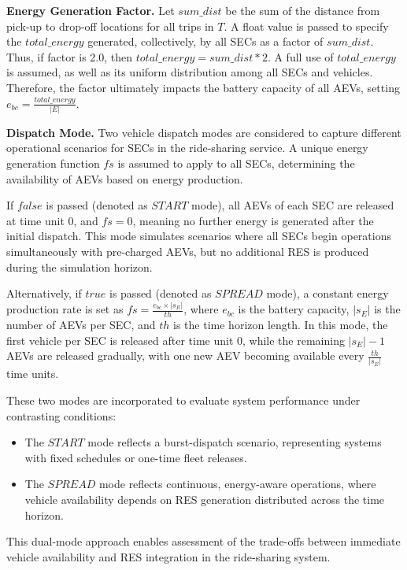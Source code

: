 \textbf{Energy Generation Factor.} Let $sum\_dist$ be the sum of the distance from pick-up to drop-off locations for all trips in $T$.  A float value is passed to specify the $total\_energy$ generated, collectively, by all SECs as a factor of $sum\_dist$. Thus, if factor is 2.0, then $total\_energy = sum\_dist * 2$.  A full use of $total\_energy$ is assumed, as well as its uniform distribution among all SECs and vehicles. Therefore,  the factor ultimately impacts the battery capacity of all AEVs, setting $e_{bc} = \frac{total\_energy}{|E|}$. 

\textbf{Dispatch Mode.} Two vehicle dispatch modes are considered to capture different operational scenarios for SECs in the ride-sharing service. A unique energy generation function $fs$ is assumed to apply to all SECs, determining the availability of AEVs based on energy production.

If $false$ is passed (denoted as $START$ mode), all AEVs of each SEC are released at time unit 0, and $fs = 0$, meaning no further energy is generated after the initial dispatch. This mode simulates scenarios where all SECs begin operations simultaneously with pre-charged AEVs, but no additional RES is produced during the simulation horizon.

Alternatively, if $true$ is passed (denoted as $SPREAD$ mode), a constant energy production rate is set as $fs = \frac{e_{bc} \times |s_E|}{th}$, where $e_{bc}$ is the battery capacity, $|s_E|$ is the number of AEVs per SEC, and $th$ is the time horizon length. In this mode, the first vehicle per SEC is released after time unit 0, while the remaining $|s_E|-1$ AEVs are released gradually, with one new AEV becoming available every $\frac{th}{|s_E|}$ time units.

These two modes are incorporated to evaluate system performance under contrasting conditions: 
\begin{itemize}
    \item The $START$ mode reflects a burst-dispatch scenario, representing systems with fixed schedules or one-time fleet releases.
    \item The $SPREAD$ mode reflects continuous, energy-aware operations, where vehicle availability depends on RES generation distributed across the time horizon.
\end{itemize}
This dual-mode approach enables assessment of the trade-offs between immediate vehicle availability and RES integration in the ride-sharing system.


